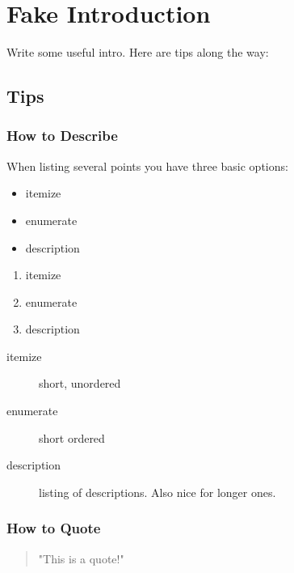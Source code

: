 \documentclass[11pt,
               a4paper,
               bibtotoc,
               idxtotoc,
               headsepline,
               footsepline,
               footexclude,
               BCOR12mm,
               DIV13,
               openany,   %
               ]
               {scrbook}
\begin{document}
\chapter{Fake Introduction}
\label{sec:intro}       %
Write some useful intro. Here are tips along the way:

\section{Tips}
\subsection{How to Describe}
\setlength{\columnsep}{30 pt}
When listing several points you have three basic options:
\begin{multicols}{3}
    \begin{itemize}
        \item itemize
        \item enumerate
        \item description
    \end{itemize}

    \vfill\null
    \columnbreak

    \begin{enumerate}
        \item itemize
        \item enumerate
        \item description
    \end{enumerate}

    \vfill\null
    \columnbreak

    \begin{description}
        \item[itemize] short, unordered
        \item[enumerate] short ordered
        \item[description] listing of descriptions. Also nice for longer ones.
    \end{description}

\end{multicols}


\subsection{How to Quote}

\begin{quote}
    "This is a quote!"
\end{quote}
\end{document}

